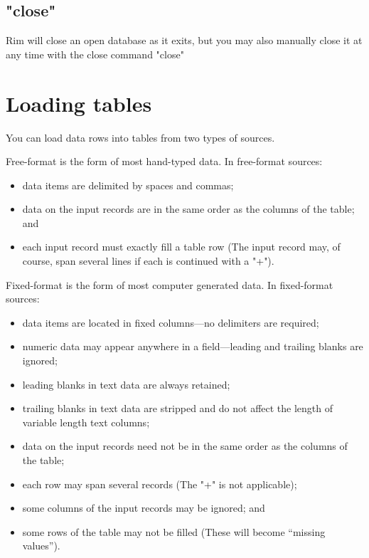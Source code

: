 \subsection{"close"}
Rim will close an open database as it exits, but you
may also manually close it at any time with the close
command
\<"close"\>
 
 
\section{Loading tables}
%
You can load data rows into tables from two types of sources.
 
\begin{List}
\item[Free-format] is the form of most hand-typed data.
  In free-format sources:
  \begin{itemize}
  \item data items are delimited by spaces and commas;
  \item data on the input records are in the same order as
     the columns of the table; and
  \item each input record must exactly fill a table row (The
     input record may, of course, span several lines if each
     is continued with a "+").
  \end{itemize}
\item[Fixed-format] is the form of most computer generated data.
  In fixed-format sources:
  \begin{itemize}
  \item data items are located in fixed columns---no delimiters
     are required;
  \item numeric data may appear anywhere in a field---leading and
     trailing blanks are ignored;
  \item leading blanks in text data are always retained;
  \item trailing blanks in text data are stripped and do not
     affect the length of variable length text columns;
  \item data on the input records need not be in the same order as
     the columns of the table;
  \item each row may span several records (The "+" is not applicable);
  \item some columns of the input records may be ignored;   and
  \item some rows of the table may not be filled (These will become
     ``missing values'').
  \end{itemize}
\end{List}
 
